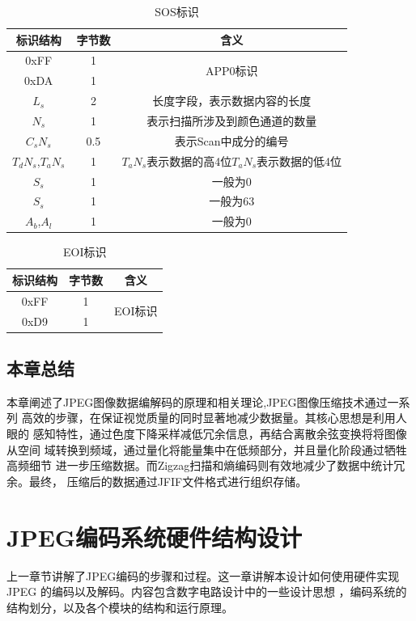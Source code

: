 \documentclass{article}
\numberwithin {equation}{section}
\begin{document}
\begin{spacing}{1.25}
    \begin{table}[H]
      \centering
      \caption{SOS标识}
      \begin{tabular}{ccc}
        \toprule
        标识结构 & 字节数 & 含义\\
        \midrule
        0xFF & 1 & \multirow{2}{*}{APP0标识}\\
        0xDA & 1 &\\
        $L_{s}$ & 2 & 长度字段，表示数据内容的长度\\
        $N_{s}$ & 1 & 表示扫描所涉及到颜色通道的数量\\
        $C_{s}N_{s}$ & 0.5 & 表示Scan中成分的编号\\
        $T_{d}N_{s}$,$T_{a}N_{s}$ & 1 & $T_{a}N_{s}$表示数据的高4位$T_{a}N_{s}$表示数据的低4位\\
        $S_{s}$ & 1 & 一般为0\\
        $S_{s}$ & 1 & 一般为63\\
        $A_{b}$,$A_{l}$ & 1 & 一般为0\\
        \bottomrule
      \end{tabular}
    \end{table}

    \begin{table}[H]
      \centering
      \caption{EOI标识}
      \begin{tabular}{ccc}
        \toprule
        标识结构 & 字节数 & 含义\\
        \midrule
        0xFF & 1 & \multirow{2}{*}{EOI标识}\\
        0xD9 & 1 &\\
        \bottomrule
      \end{tabular}
    \end{table}
  \subsection{本章总结}
    \vspace{1em}
    本章阐述了JPEG图像数据编解码的原理和相关理论,JPEG图像压缩技术通过一系列
    高效的步骤，在保证视觉质量的同时显著地减少数据量。其核心思想是利用人眼的
    感知特性，通过色度下降采样减低冗余信息，再结合离散余弦变换将将图像从空间
    域转换到频域，通过量化将能量集中在低频部分，并且量化阶段通过牺牲高频细节
    进一步压缩数据。而Zigzag扫描和熵编码则有效地减少了数据中统计冗余。最终，
    压缩后的数据通过JFIF文件格式进行组织存储。

\newpage
\section{JPEG编码系统硬件结构设计}
  \vspace{1em}
  上一章节讲解了JPEG编码的步骤和过程。这一章讲解本设计如何使用硬件实现JPEG
  的编码以及解码。内容包含数字电路设计中的一些设计思想\cite{2004vlsi数字信号处理系统}
  ，编码系统的结构划分，以及各个模块的结构和运行原理。

\end{spacing}
\end{document}
